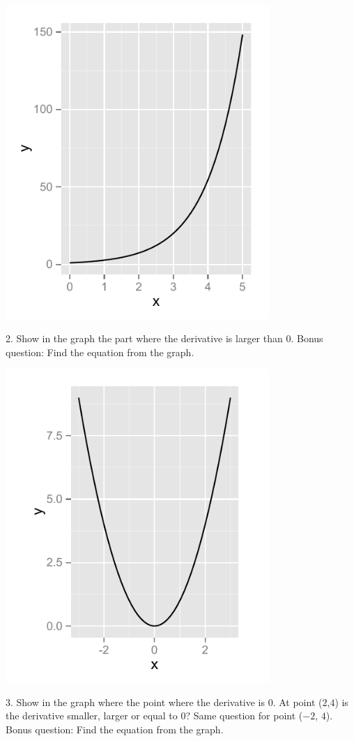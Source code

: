 \documentclass[a4paper]{report}
\begin{document}
\begin{Exercise}[title= Answer the following questions by looking at the graphs,label=ex0,difficulty=1]
\begin{minipage}{\rat\textwidth}
\includegraphics[width=0.75\textwidth]{1b.pdf}
\end{minipage}
\begin{minipage}{\rati\textwidth}
2. Show in the graph the part where the derivative is larger than $0$. Bonus question: Find the equation from the graph.
\end{minipage}

\begin{minipage}{\rat\textwidth}
\includegraphics[width=0.75\textwidth]{1c.pdf}
\end{minipage}
\begin{minipage}{\rati\textwidth}
3. Show in the graph where the point where the derivative is $0$. At point ($2$,$4$) is the derivative smaller, larger or equal to $0$? Same question for point ($-2$, $4$). Bonus question: Find the equation from the graph. 
\end{minipage}


\end{Exercise}
\end{document}
